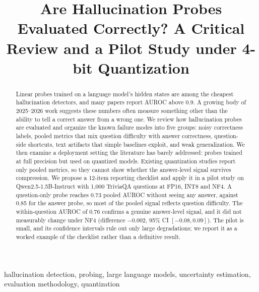 \documentclass[conference]{IEEEtran}
\begin{document}
\title{Are Hallucination Probes Evaluated Correctly? A Critical Review and a Pilot Study under 4-bit Quantization}

\author{
}

\maketitle

\begin{abstract}
Linear probes trained on a language model's hidden states are among the cheapest hallucination detectors, and many papers report AUROC above 0.9. A growing body of 2025--2026 work suggests these numbers often measure something other than the ability to tell a correct answer from a wrong one. We review how hallucination probes are evaluated and organize the known failure modes into five groups: noisy correctness labels, pooled metrics that mix question difficulty with answer correctness, question-side shortcuts, text artifacts that simple baselines exploit, and weak generalization. We then examine a deployment setting the literature has barely addressed: probes trained at full precision but used on quantized models. Existing quantization studies report only pooled metrics, so they cannot show whether the answer-level signal survives compression. We propose a 12-item reporting checklist and apply it in a pilot study on Qwen2.5-1.5B-Instruct with 1,000 TriviaQA questions at FP16, INT8 and NF4. A question-only probe reaches 0.73 pooled AUROC without seeing any answer, against 0.85 for the answer probe, so most of the pooled signal reflects question difficulty. The within-question AUROC of 0.76 confirms a genuine answer-level signal, and it did not measurably change under NF4 (difference $-0.002$, 95\% CI $[-0.08, 0.09]$). The pilot is small, and its confidence intervals rule out only large degradations; we report it as a worked example of the checklist rather than a definitive result.
\end{abstract}

\begin{IEEEkeywords}
hallucination detection, probing, large language models, uncertainty estimation, evaluation methodology, quantization
\end{IEEEkeywords}

\end{document}
